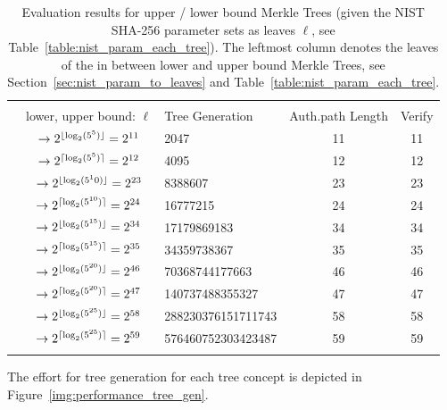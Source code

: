\begin{table}
\centering
\begin{tabular}{c c l c c} 
 \hline\noalign{\smallskip}
 \multicolumn{5}{c}{\textbf{Evaluation Results NIST: Lower / Upper Bound Merkle Tree}} \\
 \noalign{\smallskip} 
 & lower, upper bound: $\ell$ & Tree Generation & Auth.path Length & Verify \\
 \hline\noalign{\smallskip}
 \multirow{2}{*}{$5^5$} & $\rightarrow 2^{\lfloor\log_2(5^5)\rfloor} = 2^{11} $ & 2047 & 11 & 11 \\
 & $\rightarrow 2^{\lceil\log_2(5^5)\rceil} = 2^{12}$ & 4095 & 12 & 12 \\
 \hline\noalign{\smallskip} 
 \multirow{2}{*}{$5^{10}$} & $\rightarrow 2^{\lfloor\log_2(5^10)\rfloor} = 2^{23}$ & 8388607 & 23 & 23 \\
 & $\rightarrow 2^{\lceil\log_2(5^{10})\rceil} = 2^{24}$ & 16777215 & 24 & 24 \\
 \hline\noalign{\smallskip} 
 \multirow{2}{*}{$5^{15}$}& $\rightarrow 2^{\lfloor\log_2(5^{15})\rfloor} = 2^{34}$ & 17179869183 & 34 & 34 \\ 
 & $\rightarrow 2^{\lceil\log_2(5^{15})\rceil} = 2^{35}$ & 34359738367 & 35 & 35 \\ 
 \hline\noalign{\smallskip} 
 \multirow{2}{*}{$5^{20}$} & $\rightarrow 2^{\lfloor\log_2(5^{20})\rfloor} = 2^{46}$ & 70368744177663 & 46 & 46 \\ 
 & $\rightarrow 2^{\lceil\log_2(5^{20})\rceil} = 2^{47}$ & 140737488355327 & 47 & 47 \\
 \hline\noalign{\smallskip}  
  \multirow{2}{*}{$5^{25}$} & $\rightarrow 2^{\lfloor\log_2(5^{25})\rfloor} =  2^{58}$ & 288230376151711743 & 58 & 58 \\ 
 & $\rightarrow 2^{\lceil\log_2(5^{25})\rceil} = 2^{59}$ & 576460752303423487 & 59 & 59 \\
 \hline\noalign{\smallskip}
 \end{tabular}
\caption{Evaluation results for upper / lower bound Merkle Trees (given the NIST SHA-256 parameter sets as leaves $\ell$, see Table~\ref{table:nist_param_each_tree}). The leftmost column denotes the leaves of the \extree in between lower and upper bound Merkle Trees, see Section~\ref{sec:nist_param_to_leaves} and Table~\ref{table:nist_param_each_tree}.}
\label{table:eval_upper_lower_bound_nist}
\end{table}

The effort for tree generation for each tree concept is depicted in Figure~\ref{img:performance_tree_gen}.

